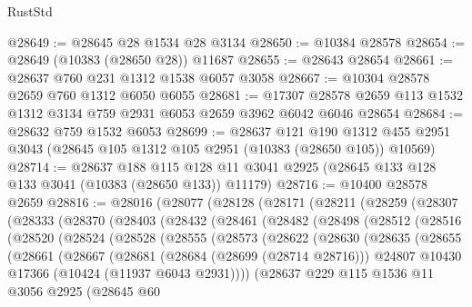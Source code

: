 \begin{lexlean}{RustStd}
\begin{coremodule}
@28649 := @28645 @28 @1534 @28 @3134
@28650 := @10384 @28578
@28654 := @28649 (@10383 (@28650 @28)) @11687
@28655 := @28643 @28654
@28661 := @28637 @760 @231 @1312 @1538 @6057 @3058
@28667 := @10304 @28578 @2659 @760 @1312 @6050 @6055
@28681 := @17307 @28578 @2659 @113 @1532 @1312 @3134 @759 @2931 @6053 @2659 @3962 @6042 @6046 @28654
@28684 := @28632 @759 @1532 @6053
@28699 := @28637
    @121
    @190
    @1312
    @455
    @2951
    @3043
    (@28645 @105 @1312 @105 @2951 (@10383 (@28650 @105)) @10569)
@28714 := @28637
    @188
    @115
    @128
    @11
    @3041
    @2925
    (@28645 @133 @128 @133 @3041 (@10383 (@28650 @133)) @11179)
@28716 := @10400 @28578 @2659
@28816 := @28016
    (@28077
      (@28128
        (@28171
          (@28211
            (@28259
              (@28307
                (@28333
                  (@28370
                    (@28403
                      (@28432
                        (@28461
                          (@28482
                            (@28498
                              (@28512
                                (@28516
                                  (@28520
                                    (@28524
                                      (@28528
                                        (@28555
                                          (@28573
                                            (@28622
                                              (@28630
                                                (@28635
                                                  (@28655
                                                    (@28661
                                                      (@28667
                                                        (@28681
                                                          (@28684 (@28699 (@28714 @28716)))
                                                          @24807
                                                          @10430
                                                          @17366
                                                          (@10424 (@11937 @6043 @2931))))
                                                      (@28637
                                                        @229
                                                        @115
                                                        @1536
                                                        @11
                                                        @3056
                                                        @2925
                                                        (@28645
                                                          @60

\end{coremodule}
\end{lexlean}
